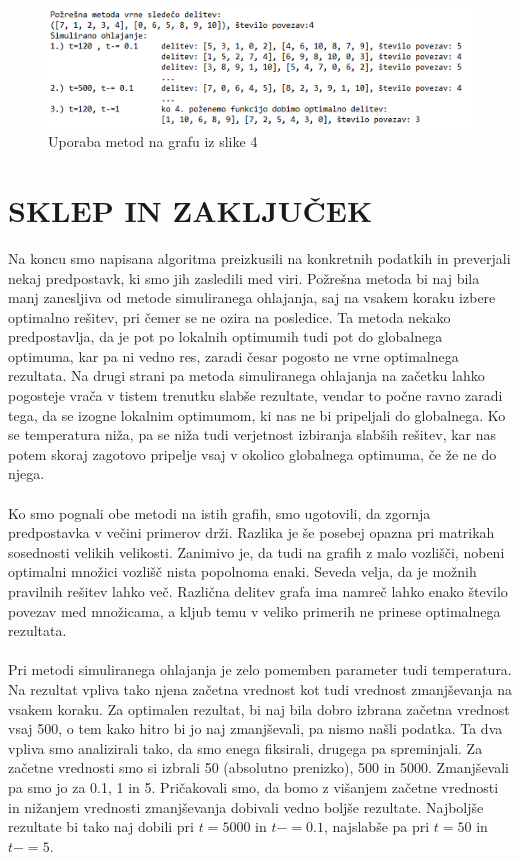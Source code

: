 \documentclass[12pt,a4paper]{amsart}
\theoremstyle{definition} %
\theoremstyle{plain} %
\begin{document}
\begin{figure}
  \centering
  \includegraphics{graf_metode}
 \caption{Uporaba metod na grafu iz slike 4}
\end{figure}
\FloatBarrier
\section{\textbf{SKLEP IN ZAKLJUČEK}}

Na koncu smo napisana algoritma preizkusili na konkretnih podatkih in preverjali nekaj predpostavk, ki smo jih zasledili med viri. Požrešna metoda bi naj bila manj zanesljiva od metode simuliranega ohlajanja, saj na vsakem koraku izbere optimalno rešitev, pri čemer se ne ozira na posledice. Ta metoda nekako predpostavlja, da je pot po lokalnih optimumih tudi pot do globalnega optimuma, kar pa ni vedno res, zaradi česar pogosto ne vrne optimalnega rezultata. Na drugi strani pa metoda simuliranega ohlajanja na začetku lahko pogosteje vrača v tistem trenutku slabše rezultate, vendar to počne ravno zaradi tega, da se izogne lokalnim optimumom, ki nas ne bi pripeljali do globalnega. Ko se temperatura niža, pa se niža tudi verjetnost izbiranja slabših rešitev, kar nas potem skoraj zagotovo pripelje vsaj v okolico globalnega optimuma, če že ne do njega. \\
\\
Ko smo pognali obe metodi na istih grafih, smo ugotovili, da zgornja predpostavka v večini primerov drži. Razlika je še posebej opazna pri matrikah sosednosti  velikih velikosti. Zanimivo je, da tudi na grafih z malo vozlišči, nobeni optimalni množici vozlišč nista popolnoma enaki. Seveda velja, da je možnih pravilnih rešitev lahko več. Različna delitev grafa ima namreč lahko enako število povezav med množicama, a kljub temu v veliko primerih ne prinese optimalnega rezultata.  \\
\\
Pri metodi simuliranega ohlajanja je zelo pomemben parameter tudi temperatura. Na rezultat vpliva tako njena začetna vrednost kot tudi vrednost zmanjševanja na vsakem koraku. Za optimalen rezultat, bi naj bila dobro izbrana začetna vrednost vsaj 500, o tem kako hitro bi jo naj zmanjševali, pa nismo našli podatka. Ta dva vpliva smo analizirali tako, da smo enega fiksirali, drugega pa spreminjali. Za začetne vrednosti smo si izbrali 50 (absolutno prenizko), 500 in 5000. Zmanjševali pa smo jo za 0.1, 1 in 5. Pričakovali smo, da bomo z višanjem začetne vrednosti in nižanjem vrednosti zmanjševanja dobivali vedno boljše rezultate. Najboljše rezultate bi tako naj dobili pri $t=5000$ in $t -=0.1$, najslabše pa pri $t=50$ in $t -=5$. \\
\end{document}
